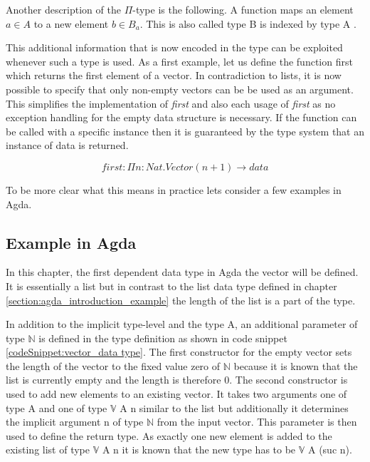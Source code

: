 Another description of the $\Pi$-type is the following. A function maps an element $a \in A$ to a new element $b \in B_a$. 
This is also called type B is indexed by type A \cite{10.1145/2841316}.


This additional information that is now encoded in the type can be exploited whenever such a type is used. As a first example, let us define the function first which returns the first element of a vector.
In contradiction to lists, it is now possible to specify that only non-empty vectors can be be used as an argument. 
This simplifies the implementation of \emph{first} and also each usage of \emph{first} as no exception handling for the empty data structure is necessary. 
If the function can be called with a specific instance then it is guaranteed by the type system that an instance of data is returned.

$$first : \Pi n : Nat.Vector(n+1) \rightarrow data$$


To be more clear what this means in practice lets consider a few examples in Agda.

\subsection{Example in Agda}\label{section_dependent_types_example}
In this chapter, the first dependent data type in Agda the vector will be defined.
It is essentially a list but in contrast to the list data type defined in chapter \ref{section:agda_introduction_example} the length of the list is a part of the type.

In addition to the implicit type-level and the type A, an additional parameter of type $\mathbb{N}$ is defined in the type definition as shown in code snippet \ref{codeSnippet:vector_data type}.
The first constructor for the empty vector sets the length of the vector to the fixed value zero of $\mathbb{N}$ because it is known that the list is currently empty and the length is therefore 0.
The second constructor is used to add new elements to an existing vector. It takes two arguments one of type A and one of type $\mathbb{V}$ A n similar to the list but additionally it determines the implicit argument n of type $\mathbb{N}$ from the input vector.
This parameter is then used to define the return type. As exactly one new element is added to the existing list of type $\mathbb{V}$ A n it is known that the new type has to be $\mathbb{V}$ A (suc n).

